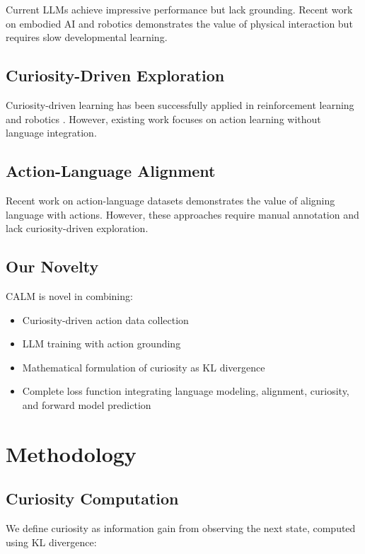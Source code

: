\documentclass{IEEEtran}
\begin{document}
Current LLMs achieve impressive performance but lack grounding. Recent work on embodied AI \cite{lan2023} and robotics \cite{pathak2017} demonstrates the value of physical interaction but requires slow developmental learning.

\subsection{Curiosity-Driven Exploration}

Curiosity-driven learning has been successfully applied in reinforcement learning \cite{burda2018} and robotics \cite{oudeyer2007b}. However, existing work focuses on action learning without language integration.

\subsection{Action-Language Alignment}

Recent work on action-language datasets \cite{lynch2020} demonstrates the value of aligning language with actions. However, these approaches require manual annotation and lack curiosity-driven exploration.

\subsection{Our Novelty}

CALM is novel in combining:
\begin{itemize}
    \item Curiosity-driven action data collection
    \item LLM training with action grounding
    \item Mathematical formulation of curiosity as KL divergence
    \item Complete loss function integrating language modeling, alignment, curiosity, and forward model prediction
\end{itemize}

\section{Methodology}

\subsection{Curiosity Computation}

We define curiosity as information gain from observing the next state, computed using KL divergence:
\end{document}
